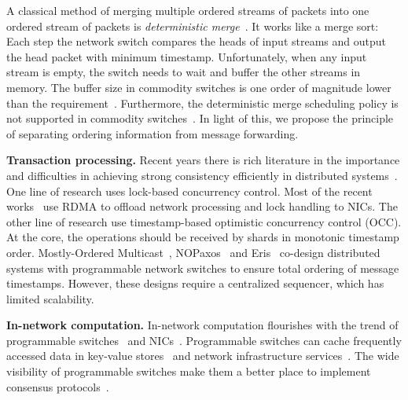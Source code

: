 A classical method of merging multiple ordered streams of packets into one ordered stream of packets is \textit{deterministic merge}~\cite{hadzilacos1994modular, aguilera2000efficient}.
It works like a merge sort: Each step the network switch compares the heads of input streams and output the head packet with minimum timestamp. %
Unfortunately, when any input stream is empty, the switch needs to wait and buffer the other streams in memory.
The buffer size in commodity switches is one order of magnitude lower than the requirement~\cite{bai2017congestion}.
Furthermore, the deterministic merge scheduling policy is not supported in commodity switches~\cite{sivaraman2015towards,sivaraman2016programmable}. In light of this, we propose the principle of separating ordering information from message forwarding.

\textbf{Transaction processing.}
Recent years there is rich literature in the importance and difficulties in achieving strong consistency efficiently in distributed systems~\cite{lloyd2011don,lloyd2013stronger,mu2014extracting,zhang2016operation,lu2015existential,ajoux2015challenges,mu2016consolidating,lu2016snow,kallman2008h,zhang2015building}.
One line of research uses lock-based concurrency control. Most of the recent works~\cite{dragojevic2014farm,kalia2016fasst,kaminsky2016design,dragojevic2015no} use RDMA to offload network processing and lock handling to NICs.
The other line of research use timestamp-based optimistic concurrency control (OCC).
At the core, the operations should be received by shards in monotonic timestamp order.
Mostly-Ordered Multicast~\cite{ports2015designing}, NOPaxos~\cite{li2016just} and Eris~\cite{eris} co-design distributed systems with programmable network switches to ensure total ordering of message timestamps. However, these designs require a centralized sequencer, which has limited scalability.

\textbf{In-network computation.}
In-network computation flourishes with the trend of programmable switches~\cite{lu2011serverswitch,tofino,bosshart2013forwarding} and NICs~\cite{kaufmann2016high,clicknp}.
Programmable switches can cache frequently accessed data in key-value stores~\cite{li2016fast,netcache-sosp17,kv-direct} and network infrastructure services~\cite{fayazbakhsh2013less,liu2017incbricks,miao2017silkroad}.
The wide visibility of programmable switches make them a better place to implement consensus protocols~\cite{dang2016network,dang2016paxos,dang2015netpaxos}.

